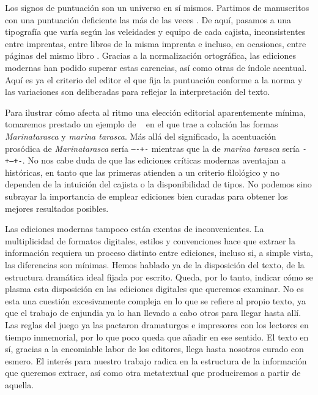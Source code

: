 Los signos de puntuación son un universo en sí mismos. Partimos de manuscritos con una puntuación deficiente las más de las veces \parencite[49-63]{arellano2007}. De aquí, pasamos a una tipografía que varía según las veleidades y equipo de cada cajista, inconsistentes entre imprentas, entre libros de la misma imprenta e incluso, en ocasiones, entre páginas del mismo libro \parencites[142-143]{blecua2001}[99]{carrenno2019}. Gracias a la normalización ortográfica, las ediciones modernas han podido superar estas carencias, así como otras de índole acentual. Aquí es ya el criterio del editor el que fija la puntuación conforme a la norma y las variaciones son deliberadas para reflejar la interpretación del texto. 

Para ilustrar cómo  afecta al ritmo una elección editorial aparentemente mínima, tomaremos prestado un ejemplo de \citeauthor{arellano2007}~\parencite*[64]{arellano2007} en el que trae a colación las formas \textit{Marinatarasca} y \textit{marina tarasca}. Más allá del significado, la acentuación prosódica de \textit{Marinatarasca} sería \texttt{----+-} mientras que la de \textit{marina tarasca} sería \texttt{-+--+-}. No nos cabe duda de que las ediciones críticas modernas aventajan a históricas, en tanto que las primeras atienden a un criterio filológico y no dependen de la intuición del cajista o la disponibilidad de tipos. No podemos sino subrayar la importancia de emplear ediciones bien curadas para obtener los mejores resultados posibles.

Las ediciones modernas tampoco están exentas de inconvenientes. La multiplicidad de formatos digitales, estilos y convenciones hace que extraer la información requiera un proceso distinto entre ediciones, incluso si, a simple vista, las diferencias son mínimas. Hemos hablado ya de la disposición del texto, de la estructura dramática ideal fijada por escrito. Queda, por lo tanto, indicar cómo se plasma esta disposición en las ediciones digitales que queremos examinar. No es esta una cuestión excesivamente compleja en lo que se refiere al propio texto, ya que el trabajo de enjundia ya lo han llevado a cabo otros para llegar hasta allí. Las reglas del juego ya las pactaron dramaturgos e impresores con los lectores en tiempo inmemorial, por lo que poco queda que añadir en ese sentido. El texto en sí, gracias a la encomiable labor de los editores, llega hasta nosotros curado con esmero. El interés para nuestro trabajo radica en la estructura de la información que queremos extraer, así como otra metatextual que produciremos a partir de aquella.

